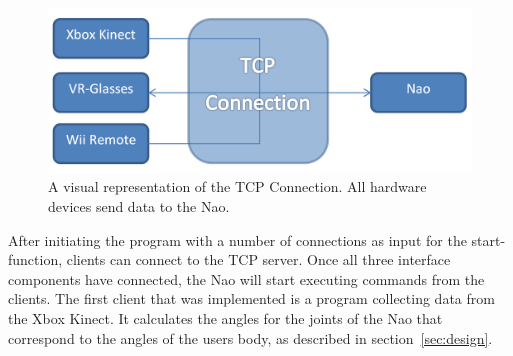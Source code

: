 \documentclass[letterpaper, 10pt, conference]{ieeeconf}
\begin{document}
\begin{figure}[h]
\label{TCP}
\center
\includegraphics[width = \columnwidth]{figure.png}
\caption{A visual representation of the TCP Connection. All hardware devices send data to the Nao.}
\end{figure}
After initiating the program with a number of connections as input for the start-function, clients can connect to the TCP server. Once all three interface components have connected, the Nao will start executing commands from the clients.
The first client that was implemented is a program collecting data from the Xbox Kinect. It calculates the angles for the joints of the Nao that correspond to the angles of the users body, as described in section~\ref{sec:design}. 
\end{document}

